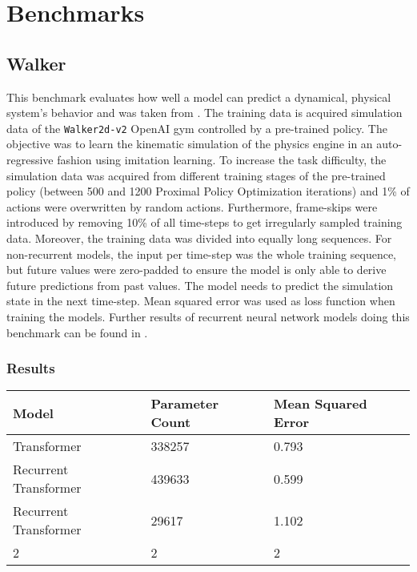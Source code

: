 \documentclass[draft,final]{vutinfth} %
\begin{document}
\section{Benchmarks}
\subsection{Walker}
This benchmark evaluates how well a model can predict a dynamical, physical system's behavior and was taken from \cite{LongTermDependenciesIrregularTimeSeries}.
The training data is acquired simulation data of the \texttt{Walker2d-v2} OpenAI gym \cite{OpenAIGym} controlled by a pre-trained policy.
The objective was to learn the kinematic simulation of the physics engine in an auto-regressive fashion using imitation learning.
To increase the task difficulty, the simulation data was acquired from different training stages of the pre-trained policy (between 500 and 1200 Proximal Policy Optimization iterations) and 1\% of actions were overwritten by random actions.
Furthermore, frame-skips were introduced by removing 10\% of all time-steps to get irregularly sampled training data. 
Moreover, the training data was divided into equally long sequences.
For non-recurrent models, the input per time-step was the whole training sequence, but future values were zero-padded to ensure the model is only able to derive future predictions from past values.
The model needs to predict the simulation state in the next time-step.
Mean squared error was used as loss function when training the models.
Further results of recurrent neural network models doing this benchmark can be found in \cite{LatentODEsIrregularlySampled}.
\subsubsection{Results}
\begin{table}[h]
\begin{tabular}{lll}
\hline
Model & Parameter Count & Mean Squared Error \\ \hline
Transformer & 338257 & 0.793 \\ 
Recurrent Transformer & 439633 & 0.599 \\ 
Recurrent Transformer & 29617 & 1.102 \\ 
2 & 2 & 2 \\ 
\end{tabular}
\end{table}
\end{document}

